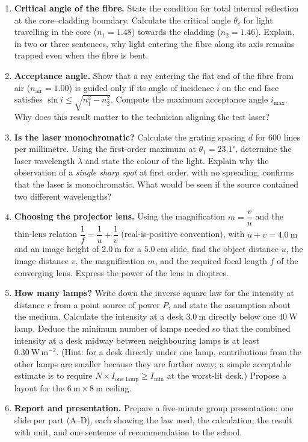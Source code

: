 \documentclass[11pt]{article}
\begin{document}
\begin{enumerate}
\item \textbf{Critical angle of the fibre.} State the condition for total internal reflection at the core--cladding boundary. Calculate the critical angle $\theta_{c}$ for light travelling in the core ($n_{1} = 1.48$) towards the cladding ($n_{2} = 1.46$). Explain, in two or three sentences, why light entering the fibre along its axis remains trapped even when the fibre is bent.

\item \textbf{Acceptance angle.} Show that a ray entering the flat end of the fibre from air ($n_{\text{air}} = 1.00$) is guided only if its angle of incidence $i$ on the end face satisfies $\sin i \leq \sqrt{n_{1}^{2}-n_{2}^{2}}$. Compute the maximum acceptance angle $i_{\max}$. Why does this result matter to the technician aligning the test laser?

\item \textbf{Is the laser monochromatic?} Calculate the grating spacing $d$ for $600$ lines per millimetre. Using the first-order maximum at $\theta_{1} = 23.1^{\circ}$, determine the laser wavelength $\lambda$ and state the colour of the light. Explain why the observation of a \emph{single sharp spot} at first order, with no spreading, confirms that the laser is monochromatic. What would be seen if the source contained two different wavelengths?

\item \textbf{Choosing the projector lens.} Using the magnification $m = \dfrac{v}{u}$ and the thin-lens relation $\dfrac{1}{f} = \dfrac{1}{u} + \dfrac{1}{v}$ (real-is-positive convention), with $u + v = 4.0\ \mathrm{m}$ and an image height of $2.0\ \mathrm{m}$ for a $5.0\ \mathrm{cm}$ slide, find the object distance $u$, the image distance $v$, the magnification $m$, and the required focal length $f$ of the converging lens. Express the power of the lens in dioptres.

\item \textbf{How many lamps?} Write down the inverse square law for the intensity at distance $r$ from a point source of power $P$, and state the assumption about the medium. Calculate the intensity at a desk $3.0\ \mathrm{m}$ directly below one $40\ \mathrm{W}$ lamp. Deduce the minimum number of lamps needed so that the combined intensity at a desk midway between neighbouring lamps is at least $0.30\ \mathrm{W\,m^{-2}}$. (Hint: for a desk directly under one lamp, contributions from the other lamps are smaller because they are further away; a simple acceptable estimate is to require $N \times I_{\text{one lamp}} \geq I_{\min}$ at the worst-lit desk.) Propose a layout for the $6\ \mathrm{m} \times 8\ \mathrm{m}$ ceiling.

\item \textbf{Report and presentation.} Prepare a five-minute group presentation: one slide per part (A--D), each showing the law used, the calculation, the result with unit, and one sentence of recommendation to the school.
\end{enumerate}
\end{document}
